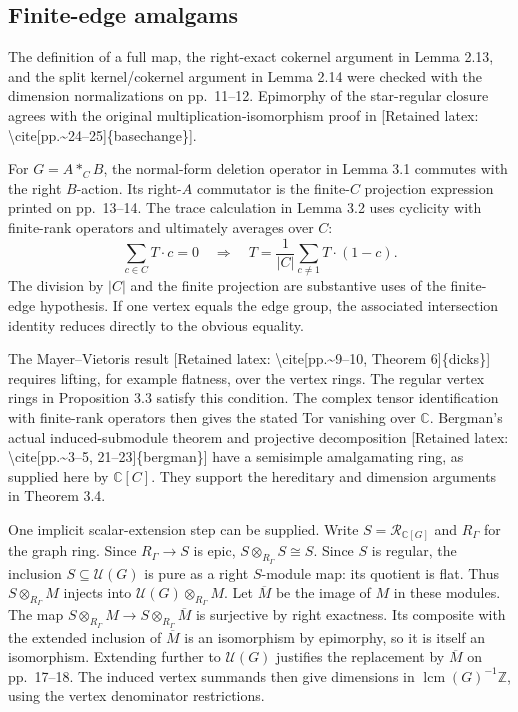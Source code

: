\documentclass[10pt]{article}
\begin{document}
\subsection*{Finite-edge amalgams}
The definition of a full map, the right-exact cokernel argument in Lemma 2.13, and the split kernel/cokernel argument in Lemma 2.14 were checked with the dimension normalizations on pp. 11–12. Epimorphy of the star-regular closure agrees with the original multiplication-isomorphism proof in [Retained latex: \textbackslash{}cite[pp.\textasciitilde{}24--25]\{basechange\}].\par
For \(G=A*_CB\), the normal-form deletion operator in Lemma 3.1 commutes with the right \(B\)-action. Its right-\(A\) commutator is the finite-\(C\) projection expression printed on pp. 13–14. The trace calculation in Lemma 3.2 uses cyclicity with finite-rank operators and ultimately averages over \(C\): \[\sum_{c\in C}T\cdot c=0
 \quad\Longrightarrow\quad
 T=\frac1{|C|}\sum_{c\ne1}T\cdot(1-c).\] The division by \(|C|\) and the finite projection are substantive uses of the finite-edge hypothesis. If one vertex equals the edge group, the associated intersection identity reduces directly to the obvious equality.\par
The Mayer–Vietoris result [Retained latex: \textbackslash{}cite[pp.\textasciitilde{}9--10, Theorem 6]\{dicks\}] requires lifting, for example flatness, over the vertex rings. The regular vertex rings in Proposition 3.3 satisfy this condition. The complex tensor identification with finite-rank operators then gives the stated Tor vanishing over \(\mathbb C\). Bergman’s actual induced-submodule theorem and projective decomposition [Retained latex: \textbackslash{}cite[pp.\textasciitilde{}3--5, 21--23]\{bergman\}] have a semisimple amalgamating ring, as supplied here by \(\mathbb C[C]\). They support the hereditary and dimension arguments in Theorem 3.4.\par
One implicit scalar-extension step can be supplied. Write \(S=\mathcal R_{\mathbb C[G]}\) and \(R_\Gamma\) for the graph ring. Since \(R_\Gamma\to S\) is epic, \(S\otimes_{R_\Gamma}S\cong S\). Since \(S\) is regular, the inclusion \(S\subseteq\mathcal U(G)\) is pure as a right \(S\)-module map: its quotient is flat. Thus \(S\otimes_{R_\Gamma}M\) injects into \(\mathcal U(G)\otimes_{R_\Gamma}M\). Let \(\overline M\) be the image of \(M\) in these modules. The map \(S\otimes_{R_\Gamma}M\to S\otimes_{R_\Gamma}\overline M\) is surjective by right exactness. Its composite with the extended inclusion of \(\overline M\) is an isomorphism by epimorphy, so it is itself an isomorphism. Extending further to \(\mathcal U(G)\) justifies the replacement by \(\overline M\) on pp. 17–18. The induced vertex summands then give dimensions in \(\operatorname{lcm}(G)^{-1}\mathbb Z\), using the vertex denominator restrictions.\par
\end{document}
